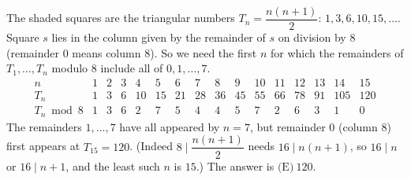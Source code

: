 The shaded squares are the triangular numbers $T_n=\dfrac{n(n+1)}{2}$: $1,3,6,10,15,\dots$. Square $s$ lies in the column given by the remainder of $s$ on division by $8$ (remainder $0$ means column $8$). So we need the first $n$ for which the remainders of $T_1,\dots,T_n$ modulo $8$ include all of $0,1,\dots,7$.
\[
\begin{array}{c|ccccccccccccccc}
n&1&2&3&4&5&6&7&8&9&10&11&12&13&14&15\\\hline
T_n&1&3&6&10&15&21&28&36&45&55&66&78&91&105&120\\
T_n\bmod 8&1&3&6&2&7&5&4&4&5&7&2&6&3&1&0
\end{array}
\]
The remainders $1,\dots,7$ have all appeared by $n=7$, but remainder $0$ (column $8$) first appears at $T_{15}=120$. (Indeed $8\mid\dfrac{n(n+1)}{2}$ needs $16\mid n(n+1)$, so $16\mid n$ or $16\mid n+1$, and the least such $n$ is $15$.) The answer is $\boxed{\text{(E)}\ 120}$.
